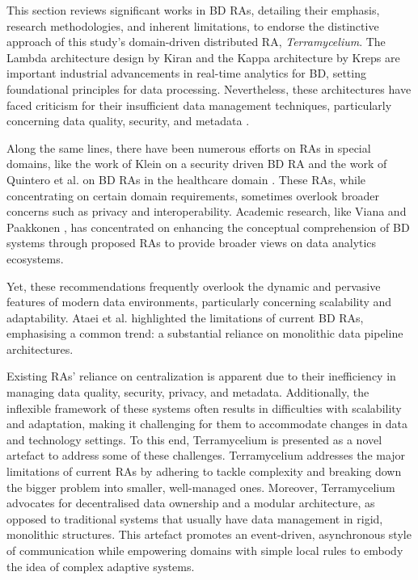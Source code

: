 \documentclass[preprint,12pt]{elsarticle}
\begin{document}
\label{sec:related_work}

This section reviews significant works in BD RAs, detailing their emphasis, research methodologies, and inherent limitations, to endorse the distinctive approach of this study's domain-driven distributed RA, \textit{Terramycelium}. The Lambda architecture design by Kiran \cite{kiran2015lambda} and the Kappa architecture by Kreps \cite{kreps2014} are important industrial advancements in real-time analytics for BD, setting foundational principles for data processing. Nevertheless, these architectures have faced criticism for their insufficient data management techniques, particularly concerning data quality, security, and metadata \cite{AtaeiACIS}. 

Along the same lines, there have been numerous efforts on RAs in special domains, like the work of Klein on a security driven BD RA \cite{klein2016reference} and the work of Quintero et al. on BD RAs in the healthcare domain \cite{quintero2019ibm}. These RAs, while concentrating on certain domain requirements, sometimes overlook broader concerns such as privacy and interoperability. Academic research, like Viana \cite{viana2014proposal} and Paakkonen \cite{paakkonen2015reference}, has concentrated on enhancing the conceptual comprehension of BD systems through proposed RAs to provide broader views on data analytics ecosystems. 

Yet, these recommendations frequently overlook the dynamic and pervasive features of modern data environments, particularly concerning scalability and adaptability. Ataei et al. \cite{ataei2022state} highlighted the limitations of current BD RAs, emphasising a common trend: a substantial reliance on monolithic data pipeline architectures. 

Existing RAs' reliance on centralization is apparent due to their inefficiency in managing data quality, security, privacy, and metadata. Additionally, the inflexible framework of these systems often results in difficulties with scalability and adaptation, making it challenging for them to accommodate changes in data and technology settings. To this end, Terramycelium is presented as a novel artefact to address some of these challenges. Terramycelium addresses the major limitations of current RAs by adhering to tackle complexity and breaking down the bigger problem into smaller, well-managed ones. Moreover, Terramycelium advocates for decentralised data ownership and a modular architecture, as opposed to traditional systems that usually have data management in rigid, monolithic structures. This artefact promotes an event-driven, asynchronous style of communication while empowering domains with simple local rules to embody the idea of complex adaptive systems. 
\end{document}
